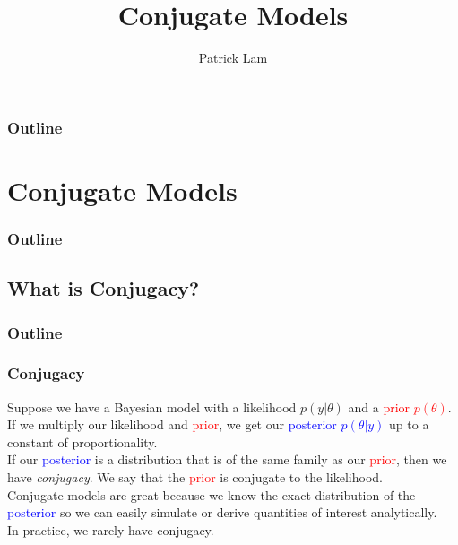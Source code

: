 \documentclass[handout]{beamer}
\author{Patrick Lam}
\title{Conjugate Models}
\date{}
\begin{document}
\newcommand{\red}{\textcolor{red}}
\newcommand{\blue}{\textcolor{blue}}
\newcommand{\purple}{\textcolor{purple}}

\frame{\titlepage}

\begin{frame}
\frametitle{Outline}
\tableofcontents
\end{frame}

\section{Conjugate Models}

\begin{frame}
\frametitle{Outline}
\tableofcontents[currentsection]
\end{frame}

\subsection{What is Conjugacy?}

\begin{frame}
\frametitle{Outline}
\tableofcontents[currentsubsection]
\end{frame}

\begin{frame}
\frametitle{Conjugacy}
\pause
Suppose we have a Bayesian model with a likelihood $p(y | \theta)$ and
a \red{prior $p(\theta)$}.\\
\pause
\bigskip
If we multiply our likelihood and \red{prior}, we get our \blue{posterior
$p(\theta | y)$} up to a constant of proportionality.\\
\pause
\bigskip
If our \blue{posterior} is a distribution that is of the same family as our
\red{prior}, then we have \textit{conjugacy}.  \pause We say that the
\red{prior} is conjugate to the likelihood.\\
\pause
\bigskip
Conjugate models are great because we know the exact distribution of
the \blue{posterior} so we can easily simulate or derive quantities of
interest analytically.\\
\pause
\bigskip
In practice, we rarely have conjugacy.
\end{frame}
\end{document}

